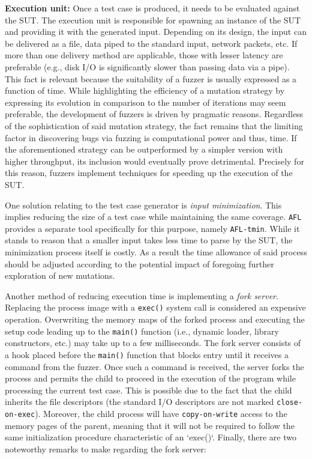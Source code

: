 \textbf{Execution unit:} Once a test case is produced, it needs to be evaluated against the SUT. The execution unit is responsible for spawning an instance of the SUT and providing it with the generated input. Depending on its design, the input can be delivered as a file, data piped to the standard input, network packets, etc. If more than one delivery method are applicable, those with lesser latency are preferable (e.g., disk I/O is significantly slower than passing data via a pipe). This fact is relevant because the suitability of a fuzzer is usually expressed as a function of time. While highlighting the efficiency of a mutation strategy by expressing its evolution in comparison to the number of iterations may seem preferable, the development of fuzzers is driven by pragmatic reasons. Regardless of the sophistication of said mutation strategy, the fact remains that the limiting factor in discovering bugs via fuzzing is computational power and thus, time. If the aforementioned strategy can be outperformed by a simpler version with higher throughput, its inclusion would eventually prove detrimental. Precisely for this reason, fuzzers implement techniques for speeding up the execution of the SUT.

One solution relating to the test case generator is \textit{input minimization}. This implies reducing the size of a test case while maintaining the same coverage. \texttt{AFL} provides a separate tool specifically for this purpose, namely \texttt{\texttt{AFL}-tmin}. While it stands to reason that a smaller input takes less time to parse by the SUT, the minimization process itself is costly. As a result the time allowance of said process should be adjusted according to the potential impact of foregoing further exploration of new mutations.

Another method of reducing execution time is implementing a \textit{fork server}. Replacing the process image with a \texttt{exec()} system call is considered an expensive operation. Overwriting the memory maps of the forked process and executing the setup code leading up to the \texttt{main()} function (i.e., dynamic loader, library constructors, etc.) may take up to a few milliseconds. The fork server consists of a hook placed before the \texttt{main()} function that blocks entry until it receives a command from the fuzzer. Once such a command is received, the server forks the process and permits the child to proceed in the execution of the program while processing the current test case. This is possible due to the fact that the child inherits the file descriptors (the standard I/O descriptors are not marked \texttt{close-on-exec}). Moreover, the child process will have \texttt{copy-on-write} access to the memory pages of the parent, meaning that it will not be required to follow the same initialization procedure characteristic of an `exec()`. Finally, there are two noteworthy remarks to make regarding the fork server:

